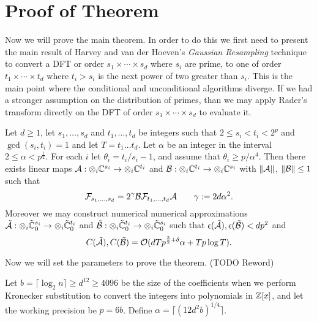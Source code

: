 \medskip

\section{Proof of Theorem}%
\label{sec:proof-of-theorem}

Now we will prove the main theorem. In order to do this we first need to present the main result of Harvey and van der Hoeven's \emph{Gaussian Resampling} technique to convert a DFT or order $s_1 \times \cdots \times s_d$ where $s_i$ are prime, to one of order $t_1 \times \cdots \times t_d$ where $t_i > s_i$ is the next power of two greater than $s_i$. This is the main point where the conditional and unconditional algorithms diverge. If we had a stronger assumption on the distribution of primes, than we may apply Rader's transform directly on the DFT of order $s_1 \times \cdots \times s_d$ to evaluate it.

\begin{theorem}
    Let $d \geq 1$, let $s_1, \ldots, s_d$ and $t_1, \ldots, t_d$ be integers such that $2 \leq s_i < t_i < 2^p$ and $\gcd(s_i, t_i) = 1$ and let $T = t_1\ldots t_d$. Let $\alpha$ be an integer in the interval $2 \leq \alpha < p^{\frac{1}{2}}$. For each $i$ let $\theta_i = t_i / s_i - 1$, and assume that $\theta_i \geq p/\alpha^4$. Then there exists linear maps $\mathcal A: \otimes_i {\mathbb C}^{s_i} \to \otimes_i {\mathbb C}^{t_i}$ and $\mathcal B: \otimes_i {\mathbb C}^{t_i} \to \otimes_i {\mathbb C}^{s_i}$ with $\|\mathcal A\|$, $\|\mathcal B\| \leq 1$ such that
    \[
        \mathcal F_{s_1, \ldots, s_d} = 2^\gamma \mathcal B \mathcal F_{t_1, \ldots, t_d} \mathcal A \qquad \gamma := 2d\alpha^2.
    \]
    Moreover we may construct numerical numerical approximations $\tilde{\mathcal A}: \otimes_i \tilde{{\mathbb C}}^{s_i}_0 \to \otimes_i \tilde{{\mathbb C}}^{t_i}_0$ and $\tilde{\mathcal B}: \otimes_i \tilde{{\mathbb C}}^{t_i}_0 \to \otimes_i \tilde{{\mathbb C}}^{s_i}_0$  such that $\epsilon(\tilde{\mathcal A}), \epsilon(\tilde{\mathcal B}) < dp^2$ and
    \[
        C(\tilde{\mathcal A}), C(\tilde{\mathcal B}) = \mathcal O(dTp^{{\frac{3}{2}} + \delta}\alpha + Tp\log T).
    \]
\end{theorem}

\medskip

Now we will set the parameters to prove the theorem. (TODO Reword)

Let $b = \lceil \log_2 n\rceil \geq d^{12} \geq 4096$ be the size of the coefficients when we perform Kronecker substitution to convert the integers into polynomials in ${\mathbb Z}[x]$, and let the working precision be $p = 6b$. Define $\alpha = \lceil (12d^2 b)^{1/4}\rceil$.

